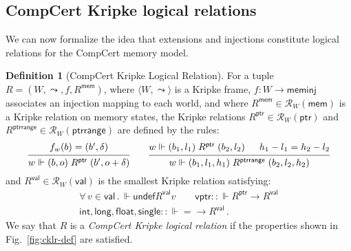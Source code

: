 \documentclass[11pt,oneside,draft]{book}
\theoremstyle{definition}
\newtheorem{definition}[theorem]{Definition}
\newcommand{\kw}[1]{\ensuremath{ \mathsf{#1} }}
\begin{document}

\subsection{CompCert Kripke logical relations} \label{sec:cklrdef} %

We can now formalize the idea that
extensions and injections
constitute logical relations for the CompCert memory model.

\begin{definition}[CompCert Kripke Logical Relation] \label{def:cklr} %
For a tuple $R = (W, \leadsto, f, R^\kw{mem})$,
where
$\langle W, \leadsto \rangle$ is a Kripke frame,
$f : W \rightarrow \kw{meminj}$
associates an injection mapping to each world, and where
$R^\kw{mem} \in \mathcal{R}_{W}(\kw{mem})$
is a Kripke relation on memory states,
the Kripke relations
$R^\kw{ptr} \in \mathcal{R}_W(\kw{ptr})$ and
$R^\kw{ptrrange} \in \mathcal{R}_W(\kw{ptrrange})$
are defined by the rules:
\[
  \begin{prooftree}
    \hypo{f_w(b) = (b', \delta)}
    \infer1{w \Vdash (b, o) \mathrel{R^\kw{ptr}} (b', o + \delta)}
  \end{prooftree}
  \qquad
  \begin{prooftree}
    \hypo{w \Vdash (b_1, l_1) \mathrel{R^\kw{ptr}} (b_2, l_2)}
    \hypo{h_1 - l_1 = h_2 - l_2}
    \infer2{w \Vdash (b_1, l_1, h_1) \mathrel{R^\kw{ptrrange}} (b_2, l_2, h_2)}
  \end{prooftree}
\]
and
$R^\kw{val} \in \mathcal{R}_W(\kw{val})$
is the smallest Kripke relation satisfying:
\begin{gather*}
  \forall \, v \in \kw{val} \,.\,
    \Vdash \kw{undef} \mathrel{R^\kw{val}} v \qquad
  \kw{vptr} :: {\Vdash R^\kw{ptr} \rightarrow R^\kw{val}} \\
  \kw{int}, \kw{long}, \kw{float}, \kw{single} ::
    {\Vdash {=} \rightarrow R^\kw{val}} \,.
\end{gather*}
We say that $R$ is a \emph{CompCert Kripke logical relation}
if the properties shown in Fig.~\ref{fig:cklr-def} are satisfied.
\end{definition}
\end{document}
